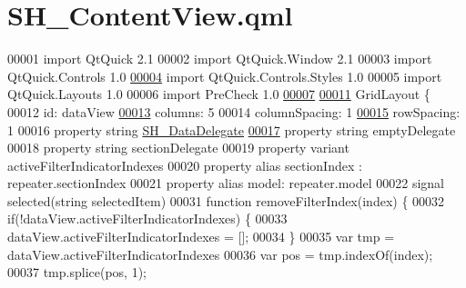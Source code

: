 \hypertarget{SH__ContentView_8qml}{\section{S\-H\-\_\-\-Content\-View.\-qml}
\label{SH__ContentView_8qml}
}

\begin{DoxyCode}
00001 \textcolor{keyword}{import} QtQuick 2.1
00002 import QtQuick.Window 2.1
00003 import QtQuick.Controls 1.0
\hypertarget{SH__ContentView_8qml_source_l00004}{}\hyperlink{classSH__ContentView}{00004} import QtQuick.Controls.Styles 1.0
00005 import QtQuick.Layouts 1.0
00006 import PreCheck 1.0
\hypertarget{SH__ContentView_8qml_source_l00007}{}\hyperlink{classSH__ContentView_a61539dec6a9f22a4bab8fad98231e549}{00007} 
\hypertarget{SH__ContentView_8qml_source_l00011}{}\hyperlink{classSH__ContentView_a5a5fa8f42e23b857494f2c88b39d1177}{00011} GridLayout \{
00012     \textcolor{keywordtype}{id}: dataView
\hypertarget{SH__ContentView_8qml_source_l00013}{}\hyperlink{classSH__ContentView_a7ea5cf24986d3fb77ebcdfc9c3a3822a}{00013}     columns: 5
00014     columnSpacing: 1
\hypertarget{SH__ContentView_8qml_source_l00015}{}\hyperlink{classSH__ContentView_a554c2eaf9b48986c87fa8fb0178c0d1d}{00015}     rowSpacing: 1
00016     \textcolor{keyword}{property} \textcolor{keywordtype}{string} \hyperlink{classSH__DataDelegate}{SH\_DataDelegate}
\hypertarget{SH__ContentView_8qml_source_l00017}{}\hyperlink{classSH__ContentView_ace8288902fb10eb93de67293bc8ac57c}{00017}     \textcolor{keyword}{property} \textcolor{keywordtype}{string} emptyDelegate
00018     \textcolor{keyword}{property} \textcolor{keywordtype}{string} sectionDelegate
00019     \textcolor{keyword}{property} variant activeFilterIndicatorIndexes
00020     \textcolor{keyword}{property} alias sectionIndex : repeater.sectionIndex
00021     \textcolor{keyword}{property} alias model: repeater.model
00022     signal selected(\textcolor{keywordtype}{string} selectedItem)
00031     \textcolor{keyword}{function} removeFilterIndex(index) \{
00032         \textcolor{keywordflow}{if}(!dataView.activeFilterIndicatorIndexes) \{
00033             dataView.activeFilterIndicatorIndexes = [];
00034         \}
00035         var tmp = dataView.activeFilterIndicatorIndexes
00036         var pos = tmp.indexOf(index);
00037         tmp.splice(pos, 1);

\end{DoxyCode}
